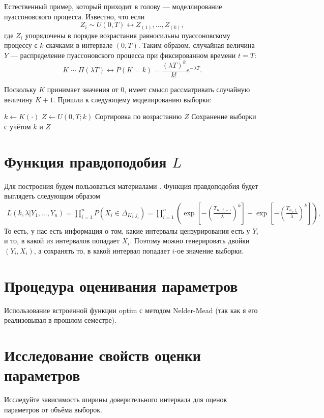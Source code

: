 \documentclass{article}
\begin{document}
	Естественный пример, который приходит в голову --- моделлирование пуассоновского процесса. Известно, что если
	\begin{equation*}
		Z_i\sim U(0,T)\leftrightarrow Z_{(1)},\dots,Z_{(k)},
	\end{equation*} 
	где $Z_i$ упорядочены в порядке возрастания равносильны пуассоновскому процессу с $k$ скачками в интервале $(0, T)$. Таким образом, случайная величина $Y$ --- распределение пуассоновского процесса при фиксированном времени $t = T$:
	\begin{equation*}
		K\sim\Pi(\lambda T)\leftrightarrow P(K=k)=\dfrac{(\lambda T)^k}{k!}e^{-\lambda T}.
	\end{equation*}
	
	Поскольку $K$ принимает значения от 0, имеет смысл рассматривать случайную величину $K+1$. Пришли к следующему моделированию выборки:
	\begin{algorithmic}[1]
		\State $k \gets K(\cdot)$
		\State $Z\gets U(0, T; k)$
		\State Сортировка по возрастанию $Z$
		\State Сохранение выборки с учётом $k$ и $Z$
		\EndFor
	\end{algorithmic}
	\section{Функция правдоподобия $L$}
	Для построения будем пользоваться материалами \cite{RomGu}. Функция правдоподобия будет выглядеть следующим образом
	\begin{align*}
		L(k, \lambda|Y_1,...,Y_n)=\prod_{i=1}^nP(X_i\in\Delta_{K_i, j_i})=\prod_{i=1}^n\left(\exp\left[-\left(\frac{T_{K_i,j_i-1}}{\lambda}\right)^k\right]-\exp\left[-\left(\frac{T_{K_i,j_i}}{\lambda}\right)^k\right]\right),
	\end{align*} 
	То есть, у нас есть информация о том, какие интервалы цензурирования есть у $Y_i$ и то, в какой из интервалов попадает $X_i$. Поэтому можно генерировать двойки $(Y_i, X_i)$, а сохранять то, в какой интервал попадает $i$-ое значение выборки. 
	\section{Процедура оценивания параметров}
	Использование встроенной функции optim с методом Nelder-Mead (так как я его реализовывал в прошлом семестре).
	\section{Исследование свойств оценки параметров}
	Исследуйте зависимость ширины доверительного интервала для оценок параметров от объёма выборок.
	
	
\end{document}
